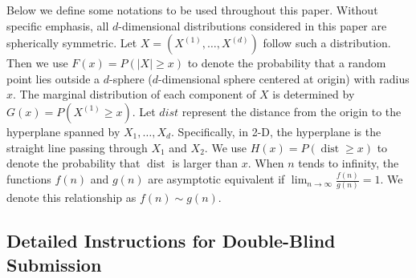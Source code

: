\documentclass[conference,a4paper]{IEEEtran}
\DeclareMathOperator{\dist}{dist}
\begin{document}
Below we define some notations to be used throughout this paper.
Without specific emphasis, all $d$-dimensional distributions considered in this paper are spherically symmetric.
Let $X=(X^{(1)},\dots, X^{(d)})$ follow such a distribution.
Then we use $F(x)=P(|X|\geq x)$ to denote the probability that a random point lies outside
a $d$-sphere ($d$-dimensional sphere centered at origin) with radius $x$.
The marginal distribution of each component of $X$ is determined by $G(x)=P(X^{(1)}\geq x)$.
Let $dist$ represent the distance from the origin to the hyperplane spanned by $X_1, \dots, X_d$.
Specifically, in 2-D, the hyperplane is the straight line passing through $X_1$ and $X_2$.
We use $H(x)=P(\dist\geq x)$ to denote the probability that $\dist$ is larger than $x$.
When $n$ tends to infinity, the functions $f(n)$ and $g(n)$ are asymptotic equivalent if $\lim_{n\to \infty} \frac{f(n)}{g(n)}=1$.
We denote this relationship as $f(n) \sim g(n)$.

\subsection{Detailed Instructions for Double-Blind Submission}
\label{sec:deta-instr}
\end{document}
